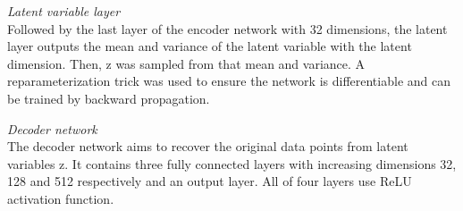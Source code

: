 \vspace{0.5cm}
\noindent\emph{Latent variable layer} \\
Followed by the last layer of the encoder network with 32 dimensions, the latent layer outputs the mean and variance of the latent variable with the latent dimension. Then, z was sampled from that mean and variance. A reparameterization trick was used to ensure the network is differentiable and can be trained by backward propagation.

\vspace{0.5cm}
\noindent\emph{Decoder network} \\
The decoder network aims to recover the original data points from latent variables z. It contains three fully connected layers with increasing dimensions 32, 128 and 512 respectively and an output layer. All of four layers use ReLU activation function. 

